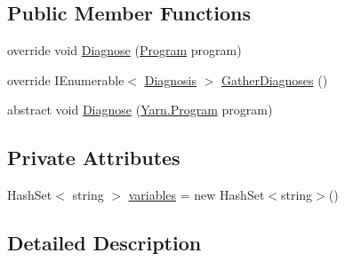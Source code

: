 \subsection*{Public Member Functions}
\begin{DoxyCompactItemize}
\item 
override void \hyperlink{a00163_a980f0e64bc5ad171c35ec19bdf838b5c}{Diagnose} (\hyperlink{a00124}{Program} program)
\item 
override I\-Enumerable$<$ \hyperlink{a00069}{Diagnosis} $>$ \hyperlink{a00163_ab84e7a8e68740379dee12a51dca69b07}{Gather\-Diagnoses} ()
\item 
abstract void \hyperlink{a00031_aba4a36cb823b11ee491074e26477d084}{Diagnose} (\hyperlink{a00124}{Yarn.\-Program} program)
\end{DoxyCompactItemize}
\subsection*{Private Attributes}
\begin{DoxyCompactItemize}
\item 
Hash\-Set$<$ string $>$ \hyperlink{a00163_a64ed6c3394c474b6cf5804a35f560746}{variables} = new Hash\-Set$<$string$>$()
\end{DoxyCompactItemize}


\subsection{Detailed Description}



